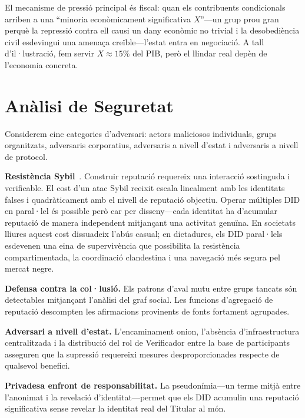 \documentclass[11pt,a4paper,twocolumn]{article}
\begin{document}
El mecanisme de pressió principal és fiscal: quan els contribuents condicionals arriben a una ``minoria econòmicament significativa $X$''---un grup prou gran perquè la repressió contra ell causi un dany econòmic no trivial i la desobediència civil esdevingui una amenaça creïble---l'estat entra en negociació. A tall d'il·lustració, fem servir $X \approx 15\%$ del PIB, però el llindar real depèn de l'economia concreta.

\section{Anàlisi de Seguretat}

Considerem cinc categories d'adversari: actors maliciosos individuals, grups organitzats, adversaris corporatius, adversaris a nivell d'estat i adversaris a nivell de protocol.

\textbf{Resistència Sybil}~\cite{douceur2002}. Construir reputació requereix una interacció sostinguda i verificable. El cost d'un atac Sybil reeixit escala linealment amb les identitats falses i quadràticament amb el nivell de reputació objectiu. Operar múltiples DID en paral·lel és possible però car per disseny---cada identitat ha d'acumular reputació de manera independent mitjançant una activitat genuïna. En societats lliures aquest cost dissuadeix l'abús casual; en dictadures, els DID paral·lels esdevenen una eina de supervivència que possibilita la resistència compartimentada, la coordinació clandestina i una navegació més segura pel mercat negre.

\textbf{Defensa contra la col·lusió.} Els patrons d'aval mutu entre grups tancats són detectables mitjançant l'anàlisi del graf social. Les funcions d'agregació de reputació descompten les afirmacions provinents de fonts fortament agrupades.

\textbf{Adversari a nivell d'estat.} L'encaminament onion, l'absència d'infraestructura centralitzada i la distribució del rol de Verificador entre la base de participants asseguren que la supressió requereixi mesures desproporcionades respecte de qualsevol benefici.

\textbf{Privadesa enfront de responsabilitat.} La pseudonímia---un terme mitjà entre l'anonimat i la revelació d'identitat---permet que els DID acumulin una reputació significativa sense revelar la identitat real del Titular al món.
\end{document}
